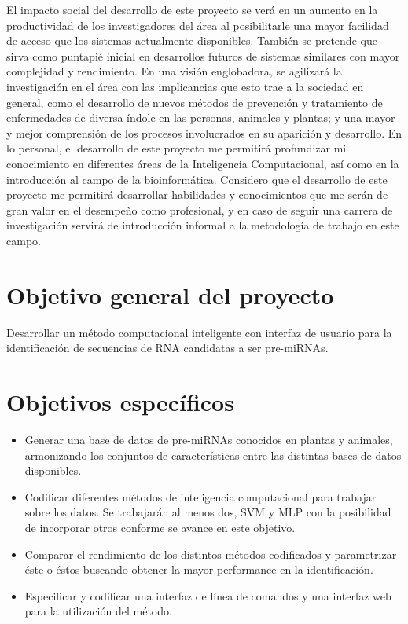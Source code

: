 \documentclass[12pt,bibliography=oldstyle,DIV=12,parskip=full-]{scrartcl}
\begin{document}
El impacto social del desarrollo de este proyecto se verá en un
aumento en la productividad de los investigadores del área al
posibilitarle una mayor facilidad de acceso que los sistemas actualmente
disponibles. También se pretende que sirva como puntapié inicial en
desarrollos futuros de sistemas similares con mayor complejidad y
rendimiento. En una visión englobadora, se agilizará la investigación
en el área con las implicancias que esto trae a la sociedad en
general, como el desarrollo de nuevos métodos de prevención y
tratamiento de enfermedades de diversa índole en las personas,
animales y plantas; y una mayor y mejor comprensión de los procesos
involucrados en su aparición y desarrollo.
En lo personal, el desarrollo de este proyecto me permitirá
profundizar mi conocimiento en diferentes áreas de la Inteligencia
Computacional, así como en la introducción al campo de la
bioinformática. Considero que el desarrollo de este proyecto me
permitirá desarrollar habilidades y conocimientos que me serán de gran
valor en el desempeño como profesional, y en caso de seguir una
carrera de investigación servirá de introducción informal a la
metodología de trabajo en este campo.
%
%
\section{Objetivo general del proyecto}
Desarrollar un método computacional inteligente con interfaz de
usuario para la identificación de secuencias de RNA candidatas a ser
pre-miRNAs.
\section{Objetivos específicos}
\begin{itemize}
\item Generar una base de datos de pre-miRNAs conocidos en plantas y
  animales, armonizando los conjuntos de características entre las
  distintas bases de datos disponibles.
\item Codificar diferentes métodos de inteligencia computacional para
  trabajar sobre los datos. Se trabajarán al menos dos, SVM y MLP con
  la posibilidad de incorporar otros conforme se avance en este
  objetivo.
\item Comparar el rendimiento de los distintos métodos codificados y
  parametrizar éste o éstos buscando obtener la mayor performance en
  la identificación.
\item Especificar y codificar una interfaz de línea de comandos y una
  interfaz web para la utilización del método.
\end{itemize}
%
%
\end{document}
